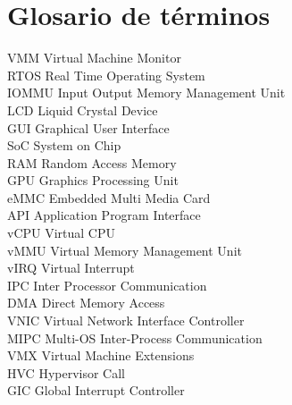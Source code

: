 \section{Glosario de términos}

VMM     Virtual Machine Monitor\\
RTOS    Real Time Operating System\\
IOMMU   Input Output Memory Management Unit\\
LCD     Liquid Crystal Device\\
GUI     Graphical User Interface\\
SoC     System on Chip\\
RAM     Random Access Memory\\
GPU     Graphics Processing Unit\\
eMMC    Embedded Multi Media Card\\
API     Application Program Interface\\
vCPU    Virtual CPU\\
vMMU    Virtual Memory Management Unit\\
vIRQ    Virtual Interrupt\\
IPC     Inter Processor Communication\\
DMA     Direct Memory Access\\
VNIC    Virtual Network Interface Controller\\
MIPC    Multi-OS Inter-Process Communication\\
VMX     Virtual Machine Extensions\\
HVC     Hypervisor Call\\
GIC     Global Interrupt Controller\\

\newpage
